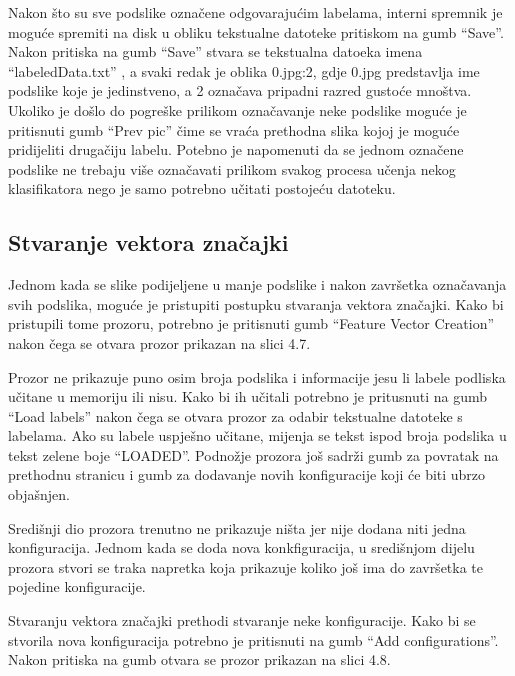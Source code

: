 \documentclass[times, utf8, zavrsni]{fer}
\begin{document}
\bigbreak

Nakon što su sve podslike označene
odgovarajućim labelama, interni spremnik je moguće spremiti na disk u obliku 
tekstualne datoteke pritiskom na gumb \enquote{Save}. Nakon pritiska na gumb
\enquote{Save} stvara se tekstualna datoeka imena \enquote{labeledData.txt}
, a svaki redak je oblika 0.jpg:2, gdje 0.jpg predstavlja ime podslike koje 
je jedinstveno, a 2 označava pripadni razred gustoće mnoštva. Ukoliko je 
došlo do pogreške prilikom označavanje neke podslike moguće je pritisnuti
gumb \enquote{Prev pic} čime se vraća prethodna slika kojoj je moguće pridijeliti
drugačiju labelu. Potebno je napomenuti da se jednom označene podslike ne trebaju 
više označavati prilikom svakog procesa učenja nekog klasifikatora nego 
je samo potrebno učitati postojeću datoteku.

\subsection{Stvaranje vektora značajki}

Jednom kada se slike podijeljene u manje podslike i nakon završetka označavanja
svih podslika, moguće je pristupiti postupku stvaranja vektora značajki. 
Kako bi pristupili tome prozoru, potrebno je pritisnuti gumb \enquote{Feature Vector Creation} 
nakon čega se otvara prozor prikazan na slici 4.7.

Prozor ne prikazuje puno osim broja podslika i informacije jesu li labele
podliska učitane u memoriju ili nisu. Kako bi ih učitali potrebno je pritusnuti
na gumb \enquote{Load labels} nakon čega se otvara prozor za odabir tekstualne datoteke
s labelama. Ako su labele uspješno učitane, mijenja se tekst ispod broja
podslika u tekst zelene boje \enquote{LOADED}. Podnožje prozora još sadrži gumb
za povratak na prethodnu stranicu i gumb za dodavanje novih konfiguracije koji će biti
ubrzo objašnjen. 

\bigbreak

Središnji dio prozora trenutno ne prikazuje ništa jer nije dodana niti jedna
konfiguracija. Jednom kada se doda nova konkfiguracija, u središnjom dijelu
prozora stvori se traka napretka koja prikazuje koliko još ima do završetka 
te pojedine konfiguracije. 

Stvaranju vektora značajki prethodi stvaranje neke konfiguracije. Kako bi se 
stvorila nova konfiguracija potrebno je pritisnuti na gumb \enquote{Add configurations}.
Nakon pritiska na gumb otvara se prozor prikazan na slici 4.8.
\end{document}
